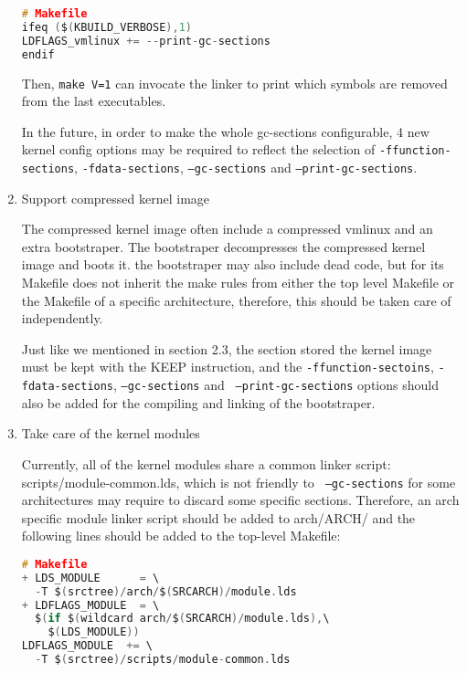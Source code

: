 \documentclass[10pt,a4paper]{article}
\begin{document}
\begin{multicols}{2}
\begin{enumerate}
\begin{lstlisting}[language=c,
                  commentstyle=\fontsize{7}{8}\selectfont,
                  basicstyle=\ttfamily\fontsize{7}{8}\selectfont]
# Makefile
ifeq ($(KBUILD_VERBOSE),1)
LDFLAGS_vmlinux += --print-gc-sections
endif
\end{lstlisting}

Then, {\small {\tt make V=1}} can invocate the linker to print which symbols
are removed from the last executables.

In the future, in order to make the whole gc-sections configurable, 4 new
kernel config options may be required to reflect the selection of
{\small {\tt -ffunction-sections}}, {\small {\tt -fdata-sections}}, {\small
{\tt --gc-sections}} and {\small {\tt --print-gc-sections}}.

\item Support compressed kernel image

The compressed kernel image often include a compressed vmlinux and an extra
bootstraper. The bootstraper decompresses the compressed kernel image
and boots it. the bootstraper may also include dead code, but for its Makefile
does not inherit the make rules from either the top level Makefile or the
Makefile of a specific architecture, therefore, this should be taken care of
independently.

Just like we mentioned in section 2.3, the section stored the kernel image must
be kept with the KEEP instruction, and the {\small {\tt -ffunction-sectoins}},
{\small {\tt -fdata-sections}}, {\small {\tt --gc-sections}} and {\small {\tt
--print-gc-sections}} options should also be added for the compiling and
linking of the bootstraper.

\item Take care of the kernel modules

Currently, all of the kernel modules share a common linker script:
scripts/module-common.lds, which is not friendly to {\small {\tt
--gc-sections}} for some architectures may require to discard some specific
sections. Therefore, an arch specific module linker script should be added to
arch/ARCH/ and the following lines should be added to the top-level Makefile:

\begin{lstlisting}[language=c,
                  commentstyle=\fontsize{7}{8}\selectfont,
                  basicstyle=\ttfamily\fontsize{7}{8}\selectfont]
# Makefile
+ LDS_MODULE      = \
  -T $(srctree)/arch/$(SRCARCH)/module.lds
+ LDFLAGS_MODULE  = \
  $(if $(wildcard arch/$(SRCARCH)/module.lds),\
	$(LDS_MODULE))
LDFLAGS_MODULE  += \
  -T $(srctree)/scripts/module-common.lds
\end{lstlisting}


\end{enumerate}
\end{multicols}
\end{document}
